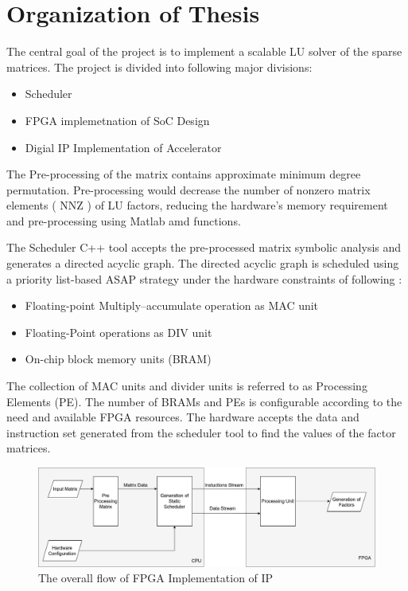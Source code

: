 \section{Organization of Thesis}

The central goal of the project is to implement a scalable LU solver of the sparse matrices. The project is divided into following major divisions:
\begin{itemize}
    \item Scheduler
    \item FPGA implemetnation of SoC Design
    \item Digial IP Implementation of Accelerator
\end{itemize} 

The Pre-processing of the matrix contains approximate minimum degree permutation. Pre-processing would decrease the number of nonzero matrix elements ( NNZ ) of LU factors, reducing the hardware's memory requirement and pre-processing using Matlab amd functions.

The Scheduler C++ tool accepts the pre-processed matrix symbolic analysis and generates a directed acyclic graph. The directed acyclic graph is scheduled using a priority list-based ASAP strategy under the hardware constraints of following :
\begin{itemize}
    \item Floating-point Multiply–accumulate operation as MAC unit
    \item Floating-Point operations as DIV unit
    \item On-chip block memory units (BRAM)
\end{itemize} 

The collection of MAC units and divider units is referred to as Processing Elements (PE). The number of BRAMs and PEs is configurable according to the need and available FPGA resources. The hardware accepts the data and instruction set generated from the scheduler tool to find the values of the factor matrices.
\begin{figure}[h]
    \centering
    \includegraphics[width = 0.9\linewidth]{./Introduction/Introduction_flow_of_project_drawio.png}
    \caption{The overall flow of FPGA Implementation of IP}
\end{figure}

